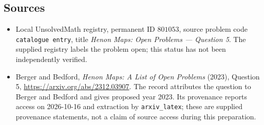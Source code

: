 \documentclass[11pt]{article}
\begin{document}
\subsection{Sources}
\begin{itemize}
\item Local UnsolvedMath registry, permanent ID \(801053\), source problem code \texttt{catalogue entry}, title \emph{Henon Maps: Open Problems --- Question 5}. The supplied registry labels the problem open; this status has not been independently verified.
\item Berger and Bedford, \emph{Henon Maps: A List of Open Problems} (2023), Question 5, \url{https://arxiv.org/abs/2312.03907}. The record attributes the question to Berger and Bedford and gives proposed year 2023. Its provenance reports access on 2026-10-16 and extraction by \texttt{arxiv\_latex}; these are supplied provenance statements, not a claim of source access during this preparation.
\end{itemize}
\end{document}
